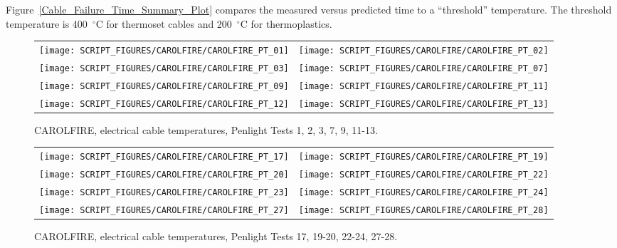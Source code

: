 Figure~\ref{Cable_Failure_Time_Summary_Plot} compares the measured versus predicted time to a ``threshold'' temperature. The threshold temperature is 400~$^\circ$C for thermoset cables and 200~$^\circ$C for thermoplastics.

\newpage

\begin{figure}[p]
\begin{tabular*}{\textwidth}{l@{\extracolsep{\fill}}r}
\texttt{[image: SCRIPT\_FIGURES/CAROLFIRE/CAROLFIRE\_PT\_01]} &
\texttt{[image: SCRIPT\_FIGURES/CAROLFIRE/CAROLFIRE\_PT\_02]} \\
\texttt{[image: SCRIPT\_FIGURES/CAROLFIRE/CAROLFIRE\_PT\_03]} &
\texttt{[image: SCRIPT\_FIGURES/CAROLFIRE/CAROLFIRE\_PT\_07]} \\
\texttt{[image: SCRIPT\_FIGURES/CAROLFIRE/CAROLFIRE\_PT\_09]} &
\texttt{[image: SCRIPT\_FIGURES/CAROLFIRE/CAROLFIRE\_PT\_11]} \\
\texttt{[image: SCRIPT\_FIGURES/CAROLFIRE/CAROLFIRE\_PT\_12]} &
\texttt{[image: SCRIPT\_FIGURES/CAROLFIRE/CAROLFIRE\_PT\_13]}
\end{tabular*}
\caption[CAROLFIRE, electrical cable temperatures, Penlight Tests 1, 2, 3, 7, 9, 11-13]{CAROLFIRE, electrical cable temperatures, Penlight Tests 1, 2, 3, 7, 9, 11-13.}
\label{CAROLFIRE_Thermoset_1}
\end{figure}

\begin{figure}[p]
\begin{tabular*}{\textwidth}{l@{\extracolsep{\fill}}r}
\texttt{[image: SCRIPT\_FIGURES/CAROLFIRE/CAROLFIRE\_PT\_17]} &
\texttt{[image: SCRIPT\_FIGURES/CAROLFIRE/CAROLFIRE\_PT\_19]} \\
\texttt{[image: SCRIPT\_FIGURES/CAROLFIRE/CAROLFIRE\_PT\_20]} &
\texttt{[image: SCRIPT\_FIGURES/CAROLFIRE/CAROLFIRE\_PT\_22]} \\
\texttt{[image: SCRIPT\_FIGURES/CAROLFIRE/CAROLFIRE\_PT\_23]} &
\texttt{[image: SCRIPT\_FIGURES/CAROLFIRE/CAROLFIRE\_PT\_24]} \\
\texttt{[image: SCRIPT\_FIGURES/CAROLFIRE/CAROLFIRE\_PT\_27]} &
\texttt{[image: SCRIPT\_FIGURES/CAROLFIRE/CAROLFIRE\_PT\_28]}
\end{tabular*}
\caption[CAROLFIRE, electrical cable temperatures, Penlight Tests 17, 19-20, 22-24, 27-28]{CAROLFIRE, electrical cable temperatures, Penlight Tests 17, 19-20, 22-24, 27-28.}
\label{CAROLFIRE_Thermoset_2}
\end{figure}

